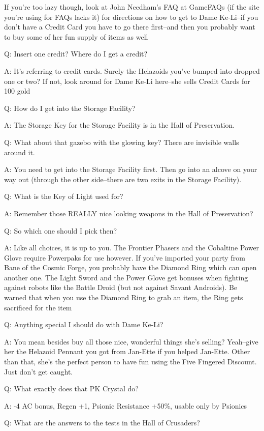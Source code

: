 \documentclass[12pt]{article}
\begin{document}
If you're too lazy though, look at John Needham's FAQ at GameFAQs (if the
site you're using for FAQs lacks it) for directions on how to get to Dame
Ke-Li--if you don't have a Credit Card you have to go there first--and then
you probably want to buy some of her fun supply of items as well

Q: Insert one credit? Where do I get a credit?

A: It's referring to credit cards. Surely the Helazoids you've bumped
into dropped one or two? If not, look around for Dame Ke-Li here--she
sells Credit Cards for 100 gold

Q: How do I get into the Storage Facility?

A: The Storage Key for the Storage Facility is in the Hall of
Preservation.

Q: What about that gazebo with the glowing key? There are invisible
walls around it.

A: You need to get into the Storage Facility first. Then go into an
alcove on your way out (through the other side--there are two exits in
the Storage Facility).

Q: What is the Key of Light used for?

A: Remember those REALLY nice looking weapons in the Hall of
Preservation?

Q: So which one should I pick then?

A: Like all choices, it is up to you. The Frontier Phasers and the
Cobaltine Power Glove require Powerpaks for use however. If you've
imported your party from Bane of the Cosmic Forge, you probably have the
Diamond Ring which can open another one. The Light Sword and the Power
Glove get bonuses when fighting against robots like the Battle Droid
(but not against Savant Androids). Be warned that when you use the
Diamond Ring to grab an item, the Ring gets sacrificed for the item

Q: Anything special I should do with Dame Ke-Li?

A: You mean besides buy all those nice, wonderful things she's selling?
Yeah--give her the Helazoid Pennant you got from Jan-Ette if you helped
Jan-Ette. Other than that, she's the perfect person to have fun using
the Five Fingered Discount. Just don't get caught.

Q: What exactly does that PK Crystal do?

A: -4 AC bonus, Regen +1, Psionic Resistance +50\%, usable only by
Psionics

Q: What are the answers to the tests in the Hall of Crusaders?
\end{document}
